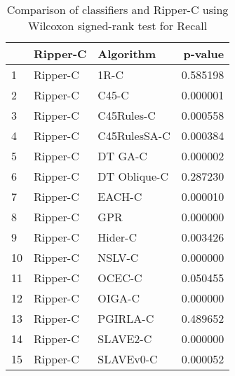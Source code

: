 \begin{table}
\footnotesize
\caption{Comparison of classifiers and Ripper-C using Wilcoxon signed-rank test for Recall}
\label{tab:Ripper-C wilcoxon Recall comparison}
\begin{tabular}{lllr}
\hline
 & Ripper-C & Algorithm & p-value \\
\hline
1 & Ripper-C & 1R-C & 0.585198 \\
2 & Ripper-C & C45-C & 0.000001 \\
3 & Ripper-C & C45Rules-C & 0.000558 \\
4 & Ripper-C & C45RulesSA-C & 0.000384 \\
5 & Ripper-C & DT GA-C & 0.000002 \\
6 & Ripper-C & DT Oblique-C & 0.287230 \\
7 & Ripper-C & EACH-C & 0.000010 \\
8 & Ripper-C & GPR & 0.000000 \\
9 & Ripper-C & Hider-C & 0.003426 \\
10 & Ripper-C & NSLV-C & 0.000000 \\
11 & Ripper-C & OCEC-C & 0.050455 \\
12 & Ripper-C & OIGA-C & 0.000000 \\
13 & Ripper-C & PGIRLA-C & 0.489652 \\
14 & Ripper-C & SLAVE2-C & 0.000000 \\
15 & Ripper-C & SLAVEv0-C & 0.000052 \\
\hline
\end{tabular}
\end{table}
